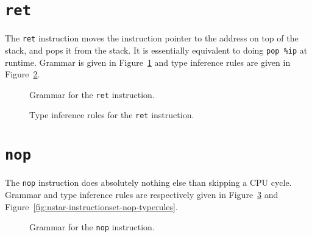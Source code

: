 \section{\texttt{ret}}\label{sec:nstar-instructionset-ret}

The \texttt{ret} instruction moves the instruction pointer to the address on top of the stack, and pops it from the stack.
It is essentially equivalent to doing \texttt{pop \%ip} at runtime.
Grammar is given in Figure~\ref{fig:nstar-instructionset-ret-grammar} and type inference rules are given in Figure~\ref{fig:nstar-instructionset-ret-typerules}.

\begin{figure}[H]
  \centering


  \caption{Grammar for the \texttt{ret} instruction.}
  \label{fig:nstar-instructionset-ret-grammar}
\end{figure}

\begin{figure}[H]
  \centering


  \caption{Type inference rules for the \texttt{ret} instruction.}
  \label{fig:nstar-instructionset-ret-typerules}
\end{figure}

\section{\texttt{nop}}\label{sec:nstar-instructionset-nop}

The \texttt{nop} instruction does absolutely nothing else than skipping a CPU cycle.
Grammar and type inference rules are respectively given in Figure~\ref{fig:nstar-instructionset-nop-grammar} and Figure~\ref{fig:nstar-instructionset-nop-typerules}.

\begin{figure}[H]
  \centering


  \caption{Grammar for the \texttt{nop} instruction.}
  \label{fig:nstar-instructionset-nop-grammar}
\end{figure}

